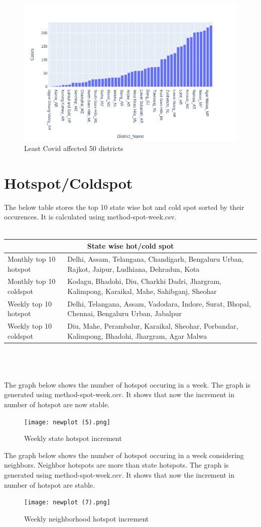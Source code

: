\documentclass[12pt]{article}
\begin{document}
\begin{figure}[h!]
\centering
\includegraphics[scale=.6]{bottom50}
\caption{Least Covid affected 50 districts}
\end{figure}
\newpage

\section{Hotspot/Coldspot}
The below table stores the top 10 state wise hot and cold spot sorted by their occurences. It is calculated using method-spot-week.csv.\\
\\
\begin{tabular}{ |p{2cm}||p{14cm}|  }
 \hline
 \multicolumn{2}{|c|}{State wise hot/cold spot} \\
 \hline
 Monthly top 10 hotspot & Delhi, Assam, Telangana, Chandigarh, Bengaluru Urban, Rajkot, Jaipur, Ludhiana, Dehradun, Kota  \\
 \hline
 Monthly top 10 coldspot & Kodagu, Bhadohi, Diu, Charkhi Dadri, Jhargram, Kalimpong, Karaikal, Mahe, Sahibganj, Sheohar\\
 \hline
 Weekly top 10 hotspot & Delhi, Telangana, Assam, Vadodara, Indore, Surat, Bhopal, Chennai, Bengaluru Urban, Jabalpur  \\
 \hline
 Weekly top 10 coldspot & Diu, Mahe, Perambalur, Karaikal, Sheohar, Porbandar, Kalimpong, Bhadohi, Jhargram,
 Agar Malwa\\
 \hline
\end{tabular}\\ \\
\\
The graph below shows the number of hotspot occuring in a week. The graph is generated using method-spot-week.csv. It shows that now the increment in number of hotspot are now stable.
\begin{figure}[h!]
\centering
\texttt{[image: newplot (5).png]}
\caption{Weekly state hotspot increment}
\end{figure}
\newpage
The graph below shows the number of hotspot occuring in a week considering neighbors. Neighbor hotspots are more than state hotspots. The graph is generated using method-spot-week.csv. It shows that now the increment in number of hotspot are stable. 
\begin{figure}[h!]
\centering
\texttt{[image: newplot (7).png]}
\caption{Weekly neighborhood hotspot increment}
\end{figure}
\end{document}
